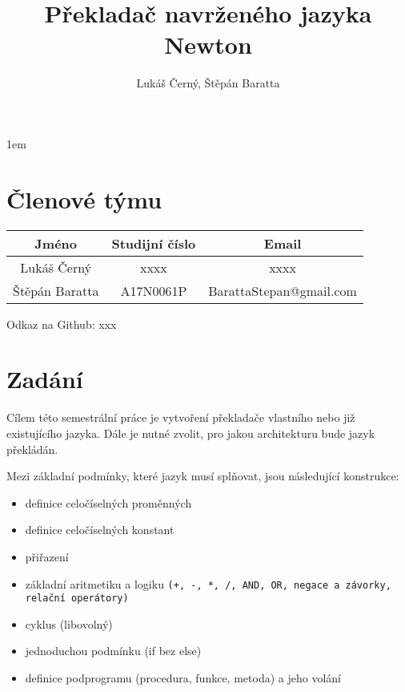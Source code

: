 \documentclass{style}
\author{Lukáš Černý, Štěpán Baratta}
\title{Překladač navrženého jazyka Newton}
\begin{document}
\pagestyle{fancy}
\renewcommand{\chaptermark}[1]{\markboth{\textit{#1}}{}}
\renewcommand{\sectionmark}[1]{\markright{\textit{#1}}{}}
\cfoot{\thepage}
\lhead{\leftmark}
\rhead{\rightmark}
\maketitle

\tableofcontents
\pagestyle{fancy}
\renewcommand{\chaptermark}[1]{\markboth{\textit{#1}}{}}
\renewcommand{\sectionmark}[1]{\markright{\textit{#1}}{}}
\cfoot{\thepage}
\lhead{\leftmark}
\rhead{\rightmark}
\parskip 1em

\chapter{Členové týmu}

\begin{table}[h]
\centering
\begin{tabular}{c|c|c}
Jméno & Studijní číslo & Email \\
\hline
Lukáš Černý & xxxx & xxxx \\
Štěpán Baratta & A17N0061P & BarattaStepan@gmail.com \\
\end{tabular}
\end{table}

Odkaz na Github: xxx

\chapter{Zadání}
Cílem této semestrální práce je vytvoření překladače vlastního nebo již existujícího jazyka. Dále je nutné zvolit, pro jakou architekturu bude jazyk překládán.

Mezi základní podmínky, které jazyk musí splňovat, jsou následující konstrukce:

\begin{itemize}
\item definice celočíselných proměnných \\
\item definice celočíselných konstant \\
\item přiřazení \\
\item základní aritmetiku a logiku \verb|(+, -, *, /, AND, OR, negace a závorky, relační operátory)| \\
\item cyklus (libovolný) \\
\item jednoduchou podmínku (if bez else) \\
\item definice podprogramu (procedura, funkce, metoda) a jeho volání \\
\end{itemize}
\end{document}
